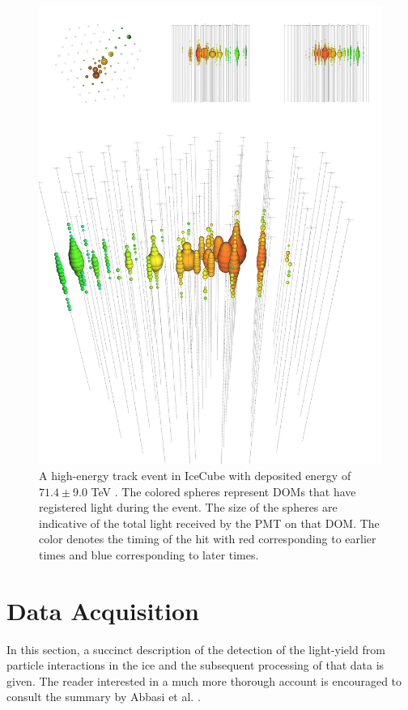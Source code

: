 \documentclass{gatech-thesis}
\begin{document}
\begin{figure}[ht]
  \begin{center}
    \includegraphics[width=1.0\textwidth,keepaspectratio]{hese_track_event.png}
  \end{center}
  \caption{A high-energy track event in IceCube with deposited energy of $71.4 \pm 9.0$ TeV \cite{2013Sci...342E...1I}. The colored spheres represent DOMs that have registered light during the event. The size of the spheres are indicative of the total light received by the PMT on that DOM. The color denotes the timing of the hit with red corresponding to earlier times and blue corresponding to later times.}
  \label{fig:track}
\end{figure}


\chapter{Data Acquisition}
In this section, a succinct description of the detection of the light-yield from particle interactions in the ice and the subsequent processing of that data is given. The reader interested in a much more thorough account is encouraged to consult the summary by Abbasi et al. \cite{2009NIMPA.601..294A}.
\end{document}
